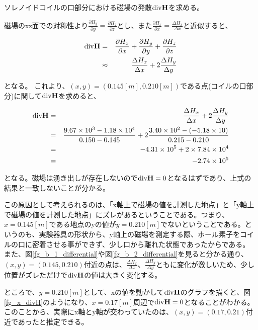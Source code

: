 \documentclass[uplatex,11pt]{jsarticle}
\newcommand{\fr}[1]{図\ref{fg_#1}}
\begin{document}
ソレノイドコイルの口部分における磁場の発散${\rm div} {\bf H}$を求める。

磁場のxz面での対称性より$\frac{\partial H_y}{\partial y} = \frac{\partial H_z}{\partial z}$とし、また$\frac{\partial H_x}{\partial x} = \frac{\Delta H_x}{\Delta x}$と近似すると、

\begin{eqnarray*}
    {\rm div} {\bf H} & = & \frac{\partial H_x}{\partial x} + \frac{\partial H_y}{\partial y} + \frac{\partial H_z}{\partial z} \\
                      & \approx & \frac{\Delta H_x}{\Delta x} + 2\frac{\Delta H_y}{\Delta y}
\end{eqnarray*}

となる。
これより、$(x, y) = (0.145[m], 0.210[m])$である点(コイルの口部分)に関して${\rm div} {\bf H}$を求めると、

\begin{eqnarray*}
    {\rm div} {\bf H} & = & \frac{\Delta H_x}{\Delta x} + 2\frac{\Delta H_y}{\Delta y} \\
                      & = & \frac{9.67 \times 10^3 - 1.18 \times 10^4}{0.150 - 0.145} + 2\frac{3.40 \times 10 ^2 - (-5.18 \times 10)}{0.215 - 0.210} \\
                      & = & -4.31 \times 10^5 + 2 \times 7.84 \times 10 ^ 4 \\
                      & = & - 2.74 \times 10^5
\end{eqnarray*}

となる。磁場は湧き出しが存在しないので${\rm div} {\bf H} = 0$となるはずであり、上式の結果と一致しないことが分かる。

この原因として考えられるのは、「x軸上で磁場の値を計測した地点」と「y軸上で磁場の値を計測した地点」にズレがあるということである。つまり、$x=0.145[m]$である地点のyの値が$y=0.210[m]$でないということである。というのも、実験器具の形状から、y軸上の磁場を測定する際、ホール素子をコイルの口に密着させる事ができず、少し口から離れた状態であったからである。
また、\fr{b_1_differential}や\fr{b_2_differential}を見ると分かる通り、$(x, y) = (0.145, 0.210)$付近の点は、$\frac{\Delta H_x}{\Delta x}$、$\frac{\Delta H_y}{\Delta y}$ともに変化が激しいため、少し位置がズレただけで${\rm div} {\bf H}$の値は大きく変化する。

ところで、$y=0.210[m]$として、xの値を動かして${\rm div} {\bf H}$のグラフを描くと、\fr{x_divH}のようになり、$x=0.17[m]$周辺で${\rm div} {\bf H} = 0$となることがわかる。
このことから、実際にx軸とy軸が交わっていたのは、$(x, y) = (0.17, 0.21)$付近であったと推定できる。
\end{document}
